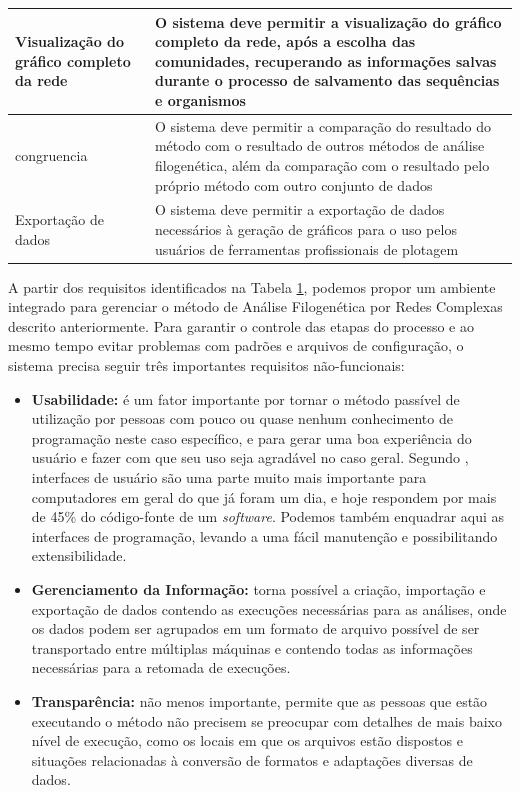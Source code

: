 \begin{table}
\begin{tabular}{p{5cm}p{10cm}}
Visualização do gráfico completo da rede & O sistema deve permitir a visualização do gráfico completo da rede, após a escolha das comunidades,
recuperando as informações salvas durante o processo de salvamento das sequências e organismos \\ \hline
\gls{congruencia} & O sistema deve permitir a comparação do resultado do método com o resultado de outros métodos de análise filogenética, além da comparação
com o resultado pelo próprio método com outro conjunto de dados \\ \hline
Exportação de dados & O sistema deve permitir a exportação de dados necessários à geração de gráficos para o uso pelos usuários de ferramentas
profissionais de plotagem \\ \hline
\end{tabular}
\label{tab:requisitos}
\end{table} 

A partir dos requisitos identificados na Tabela \ref{tab:requisitos}, podemos propor um ambiente integrado para gerenciar o método de Análise Filogenética por
Redes Complexas descrito anteriormente. Para garantir o controle das etapas do processo e ao mesmo tempo evitar problemas
com padrões e arquivos de configuração, o sistema precisa seguir três importantes requisitos não-funcionais:

\begin{itemize}
 \item{\textbf{Usabilidade:} é um fator importante por tornar o método passível de utilização por pessoas com pouco ou quase nenhum conhecimento de
programação neste caso específico, e para gerar uma boa experiência do usuário e fazer com que seu uso seja agradável no caso geral. Segundo
\cite{nielsen1993}, interfaces de usuário são uma parte muito mais importante para computadores em geral do que já foram um dia, e hoje respondem por mais
de 45\% do código-fonte de um \textit{software}. Podemos também enquadrar aqui as interfaces de programação, levando a uma fácil manutenção e possibilitando
extensibilidade.}
  \item{\textbf{Gerenciamento da Informação:} torna possível a criação, importação e exportação de dados contendo as execuções necessárias para as análises,
onde os dados podem ser agrupados em um formato de arquivo possível de ser transportado entre múltiplas máquinas e contendo todas as informações
necessárias para a retomada de execuções.}
  \item{\textbf{Transparência:} não menos importante, permite que as pessoas que estão executando o método não precisem se
preocupar com detalhes de mais baixo nível de execução, como os locais em que os arquivos estão dispostos e situações relacionadas à conversão de
formatos e adaptações diversas de dados.}
\end{itemize}

